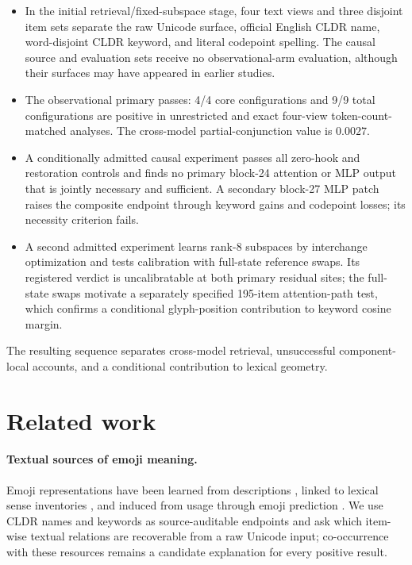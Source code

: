 \documentclass{article}
\begin{document}
\begin{itemize}
  \item In the initial retrieval/fixed-subspace stage, four text views and
  three disjoint item sets separate the raw Unicode
  surface, official English CLDR name, word-disjoint CLDR keyword, and literal
  codepoint spelling. The causal source and evaluation sets receive no
  observational-arm evaluation, although their surfaces may have appeared in
  earlier studies.
  \item The observational primary passes: 4/4 core configurations and 9/9
  total configurations are positive in unrestricted and exact four-view
  token-count-matched analyses. The cross-model partial-conjunction value is
  $0.0027$.
  \item A conditionally admitted causal experiment passes all zero-hook and
  restoration controls and finds no primary block-24 attention or MLP output
  that is jointly necessary and sufficient. A secondary block-27 MLP patch
  raises the composite endpoint through keyword gains and codepoint losses;
  its necessity criterion fails.
  \item A second admitted experiment learns rank-8 subspaces by interchange
  optimization and tests calibration with full-state reference swaps. Its
  registered verdict is uncalibratable at both primary residual sites; the
  full-state swaps motivate a separately specified 195-item attention-path
  test, which confirms a conditional glyph-position contribution to keyword
  cosine margin.
\end{itemize}

The resulting sequence separates cross-model retrieval, unsuccessful
component-local accounts, and a conditional contribution to lexical geometry.

\section{Related work}

\paragraph{Textual sources of emoji meaning.}
Emoji representations have been learned from descriptions
\citep{eisner2016emoji2vec}, linked to lexical sense inventories
\citep{wijeratne2017emojinet}, and induced from usage through emoji prediction
\citep{felbo2017deepmoji,barbieri2018interpretable}. We use CLDR names and
keywords \citep{unicode2026cldr} as source-auditable endpoints and ask which
item-wise textual relations are recoverable from a raw Unicode input;
co-occurrence with these resources remains a candidate explanation for every
positive result.
\end{document}

